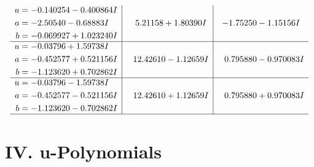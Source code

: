 \documentclass[1p]{elsarticle_modified}
\theoremstyle{definition}
\begin{document}
$$\begin{array}{c|c|c}
\begin{aligned}
u &= -0.140254 - 0.400864 I \\
a &= -2.50540 - 0.68883 I \\
b &= -0.069927 + 1.023240 I\end{aligned}
 & \phantom{-}5.21158 + 1.80390 I & -1.75250 - 1.15156 I \\ \hline\begin{aligned}
u &= -0.03796 + 1.59738 I \\
a &= -0.452577 + 0.521156 I \\
b &= -1.123620 + 0.702862 I\end{aligned}
 & \phantom{-}12.42610 - 1.12659 I & \phantom{-}0.795880 - 0.970083 I \\ \hline\begin{aligned}
u &= -0.03796 - 1.59738 I \\
a &= -0.452577 - 0.521156 I \\
b &= -1.123620 - 0.702862 I\end{aligned}
 & \phantom{-}12.42610 + 1.12659 I & \phantom{-}0.795880 + 0.970083 I\\
 \hline 
 \end{array}$$\newpage
\newpage\renewcommand{\arraystretch}{1}
\centering \section*{ IV. u-Polynomials}
\end{document}
